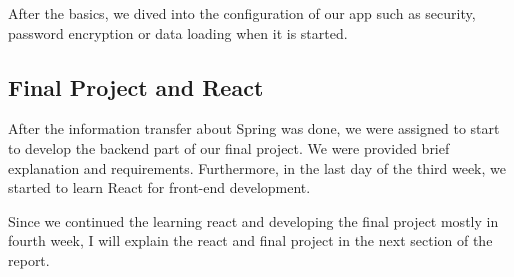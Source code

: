 
After the basics, we dived into the configuration of our app such as security, password encryption or data loading when it is started.

\subsection{Final Project and React}

After the information transfer about Spring was done, we were assigned to start to develop the backend part of our final project. We were provided brief explanation and requirements. Furthermore, in the last day of the third week, we started to learn React for front-end development.

Since we continued the learning react and developing the final project mostly in fourth week, I will explain the react and final project in the next section of the report.
